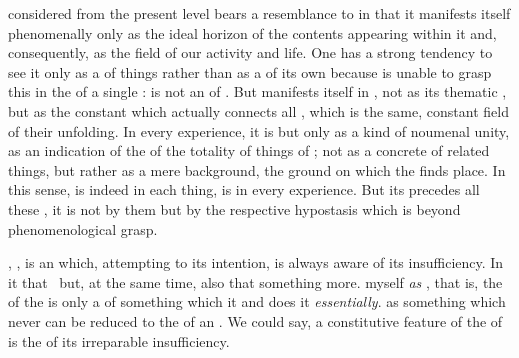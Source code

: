  considered from the present level bears a resemblance to
 in that it manifests itself phenomenally only as the ideal
horizon of the contents appearing within it and, consequently, as the field of
our activity and life.  One has a strong tendency to see it only as a
 of things rather than as a  of its own because
 is unable to grasp this  in the
 of a single :  is not an  of
.  But  manifests itself in ,
not as its thematic , but as the constant  which actually
connects all , which is the same, constant field of their
unfolding.  In every experience, it is  but only as a kind of
noumenal unity, as an indication of the  of the totality of things
of ; not as a concrete  of related things, but
rather as a mere background, the ground on which the 
finds place.  In this sense,  is indeed in each thing, is
 in every experience. But its  precedes all these
, it is not  by them but by the respective
hypostasis which is beyond phenomenological grasp.


\label{sec:I}

\pa\label{lev:I} %
,  , is an  which,
attempting to  its intention, is always aware of its
insufficiency.  In it   that  \herenow\ but, at
the same time, also that  something more.  myself {\em
  as} , that is, the  of the  is only a
 of something which  it and does it {\em essentially}.
 as something which never can be reduced to the
 of an . We could say, a constitutive feature of the
 of  is the  of its irreparable
insufficiency.

